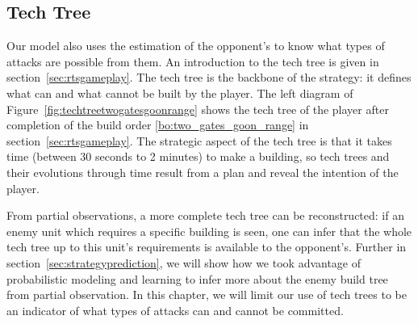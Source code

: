 \subsection{Tech Tree}
\label{sec:techtree}
Our model also uses the estimation of the opponent's  to know what types of attacks are possible from them. An introduction to the tech tree is given in section~\ref{sec:rtsgameplay}. The tech tree is the backbone of the strategy: it defines what can and what cannot be built by the player. The left diagram of Figure~\ref{fig:techtreetwogatesgoonrange} shows the tech tree of the player after completion of the build order \ref{bo:two_gates_goon_range} in section~\ref{sec:rtsgameplay}. The strategic aspect of the tech tree is that it takes time (between 30 seconds to 2 minutes) to make a building, so tech trees and their evolutions through time result from a plan and reveal the intention of the player. 

From partial observations, a more complete tech tree can be reconstructed: if an enemy unit which requires a specific building is seen, one can infer that the whole tech tree up to this unit's requirements is available to the opponent's. Further in section~\ref{sec:strategyprediction}, we will show how we took advantage of probabilistic modeling and learning to infer more about the enemy build tree from partial observation. In this chapter, we will limit our use of tech trees to be an indicator of what types of attacks can and cannot be committed.

